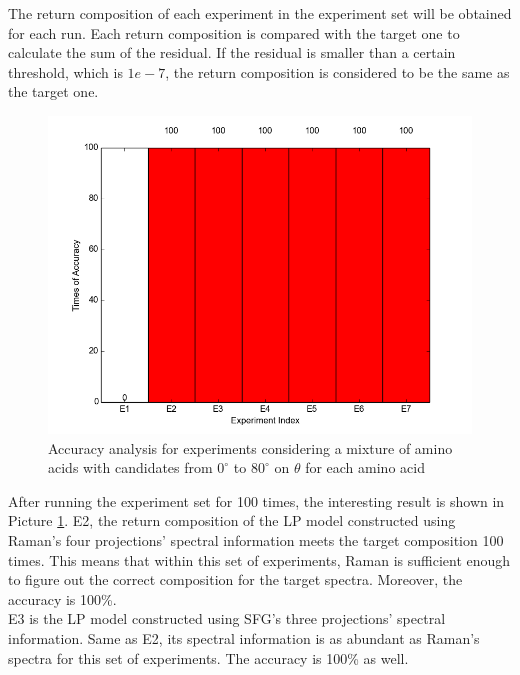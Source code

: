 The return composition of each experiment in the experiment set will be obtained for each run. Each return composition is compared with the target one to calculate the sum of the residual. If the residual is smaller than a certain threshold, which is $1e-7$, the return composition is considered to be the same as the target one. \\


\begin{figure}[!ht] \label{fig:5.1}
\centering
\includegraphics[scale=0.7]{Figures/accuracy_pecent_result8_mixture.png}
\caption{Accuracy analysis for experiments considering a mixture of amino acids with candidates from $0^{\circ}$ to $80^{\circ}$ on $\theta$ for each amino acid} 
\end{figure}

After running the experiment set for 100 times, the interesting result is shown in 
Picture \ref{fig:5.1}. E2, the return composition of the LP model constructed using Raman's four projections' spectral information meets the target composition 100 times. This means that within this set of experiments, Raman is sufficient enough to figure out the correct composition for the target spectra. Moreover, the accuracy is 100\%. \\

E3 is the LP model constructed using SFG's three projections' spectral information. Same as E2, its spectral information is as abundant as Raman's spectra for this set of experiments. The accuracy is 100\% as well. \\

